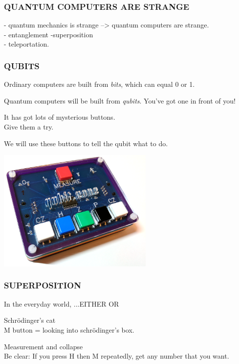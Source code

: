 \documentclass[aspectratio=169]{beamer}
\begin{document}
\newcommand\col[2]{\begin{minipage}{#1\textwidth}\raggedright #2\end{minipage}}


\begin{frame}
\frametitle{QUANTUM COMPUTERS ARE STRANGE}
- quantum mechanics is strange --> quantum computers are strange.\\
- entanglement
-superposition\\
- teleportation.
\end{frame}
\begin{frame}
\frametitle{QUBITS}

\col{0.5}{
Ordinary computers are built from \textit{bits}, which can equal 0 or 1.

\vspace{10pt}
Quantum computers will be built from \textit{qubits}. You've got one in front of you!

\vspace{10pt}
It has got lots of mysterious buttons.
\\
Give them a try.

\vspace{10pt}
We will use these buttons to tell the qubit what to do.
}
\col{0.4}{\includegraphics[height=6cm]{images/qubit_1.png}}

\end{frame}

\begin{frame}
\frametitle{SUPERPOSITION}

In the everyday world, ...EITHER OR

\vspace{20pt}
Schr\"odinger's cat\\

M button = looking into schr\"odinger's box.

Measurement and collapse\\

Be clear: If you press H then M repeatedly, get any number that you want.

\end{frame}
\end{document}
